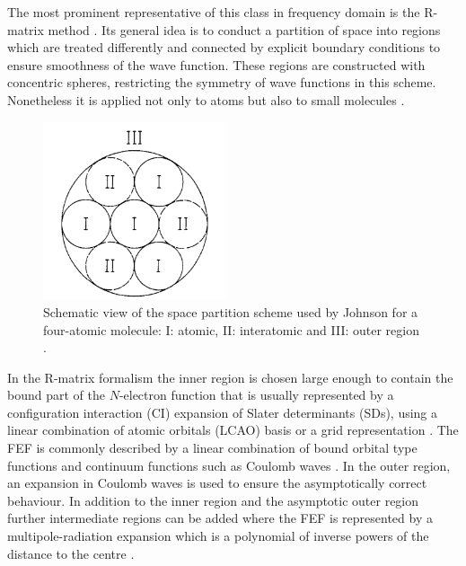 The most prominent representative of this class in frequency domain is the R-matrix method \cite{r-mat, r-mat2,Burke}.
Its general idea is to conduct a partition of space into regions which are treated differently and connected by explicit boundary conditions to ensure smoothness of the wave function.
These regions are constructed with concentric spheres, restricting the symmetry of wave functions in this scheme.
Nonetheless it is applied not only to atoms \cite{Li-R,Li-R1,Li-R2} but also to small molecules \cite{R-mol1,R-mol2}.
\begin{figure}
   \includegraphics[width=0.48\textwidth]{Figures/JohnsonSpheres}
   \caption{Schematic view of the space partition scheme used by Johnson for a four-atomic molecule:
    I: atomic, II: interatomic and III: outer region \cite{johnson}.}
   \label{fig:johnson}
\end{figure}
In the R-matrix formalism the inner region is chosen large enough to contain the bound part of the $N$-electron function that is usually represented by a configuration interaction (CI) expansion of Slater determinants (SDs), using a linear combination of atomic orbitals (LCAO) basis or a grid representation \cite{Burke}.
The FEF is commonly described by a linear combination of bound orbital type functions and continuum functions such as Coulomb waves \cite{r-mat, r-mat2}. %
In the outer region, an expansion in Coulomb waves is used to ensure the asymptotically correct behaviour.
In addition to the inner region and the asymptotic outer region further intermediate regions can be added  where the FEF is represented by a multipole-radiation expansion which is a polynomial of inverse powers of the distance to the centre \cite{Burke}.

